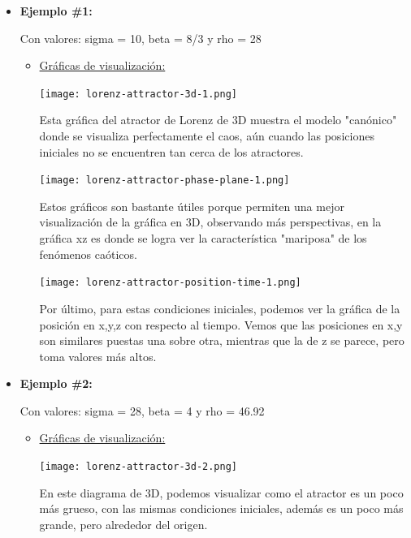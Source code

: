 \documentclass[12pt]{article}
\begin{document}
\begin{itemize}
\item \textbf{Ejemplo \#1:} 

Con valores: sigma = 10, beta = 8/3 y rho = 28 

\begin{itemize}
\item \underline{Gráficas de visualización:} 

\begin{center}
        \texttt{[image: lorenz-attractor-3d-1.png]}
\end{center}

Esta gráfica del atractor de Lorenz de 3D muestra el modelo "canónico" donde se visualiza perfectamente el caos, aún cuando las posiciones iniciales no se encuentren tan cerca de los atractores.

\begin{center}
        \texttt{[image: lorenz-attractor-phase-plane-1.png]}
\end{center}

Estos gráficos son bastante útiles porque permiten una mejor visualización de la gráfica en 3D, observando más perspectivas, en la gráfica xz es donde se logra ver la característica "mariposa" de los fenómenos caóticos.

\begin{center}
        \texttt{[image: lorenz-attractor-position-time-1.png]}
\end{center}

Por último, para estas condiciones iniciales, podemos ver la gráfica de la posición en x,y,z con respecto al tiempo. Vemos que las posiciones en x,y son similares puestas una sobre otra, mientras que la de z se parece, pero toma valores más altos. 

\end{itemize}

\item \textbf{Ejemplo \#2:} 

Con valores: sigma = 28, beta = 4 y rho = 46.92

\begin{itemize}
\item \underline{Gráficas de visualización:} 

\begin{center}
        \texttt{[image: lorenz-attractor-3d-2.png]}
\end{center}

En este diagrama de 3D, podemos visualizar como el atractor es un poco más grueso, con las mismas condiciones iniciales, además es un poco más grande, pero alrededor del origen.


\end{itemize}
\end{itemize}
\end{document}

